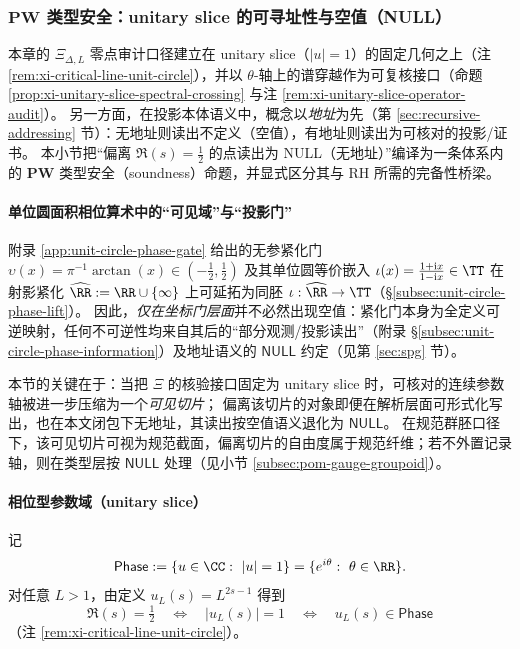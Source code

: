 \subsubsection{\texorpdfstring{$\mathbf{PW}$}{PW} 类型安全：unitary slice 的可寻址性与空值（NULL）}\label{subsec:xi-pw-type-safety-null}
本章的 \(\Xi_{\Delta,L}\) 零点审计口径建立在 unitary slice（\(|u|=1\)）的固定几何之上（注 \ref{rem:xi-critical-line-unit-circle}），并以 \(\theta\)-轴上的谱穿越作为可复核接口（命题 \ref{prop:xi-unitary-slice-spectral-crossing} 与注 \ref{rem:xi-unitary-slice-operator-audit}）。
另一方面，在投影本体语义中，概念以\emph{地址}为先（第 \ref{sec:recursive-addressing} 节）：无地址则读出不定义（空值），有地址则读出为可核对的投影/证书。
本小节把“偏离 \(\Re(s)=\tfrac12\) 的点读出为 NULL（无地址）”编译为一条体系内的 \(\mathbf{PW}\) 类型安全（soundness）命题，并显式区分其与 RH 所需的完备性桥梁。

\paragraph{单位圆面积相位算术中的“可见域”与“投影门”}
附录 \ref{app:unit-circle-phase-gate} 给出的无参紧化门
\(\upsilon(x)=\pi^{-1}\arctan(x)\in(-\tfrac12,\tfrac12)\)
及其单位圆等价嵌入
\(\iota(x)=\frac{1+\mathrm{i}x}{1-\mathrm{i}x}\in\TT\)
在射影紧化 \(\widehat{\RR}:=\RR\cup\{\infty\}\) 上可延拓为同胚 \(\iota:\widehat{\RR}\to\TT\)（\S\ref{subsec:unit-circle-phase-lift}）。
因此，\emph{仅在坐标门层面}并不必然出现空值：紧化门本身为全定义可逆映射，任何不可逆性均来自其后的“部分观测/投影读出”（附录 \S\ref{subsec:unit-circle-phase-information}）及地址语义的 \(\mathsf{NULL}\) 约定（见第 \ref{sec:spg} 节）。
\par
本节的关键在于：当把 \(\Xi\) 的核验接口固定为 unitary slice 时，可核对的连续参数轴被进一步压缩为一个\emph{可见切片}；
偏离该切片的对象即便在解析层面可形式化写出，也在本文闭包下无地址，其读出按空值语义退化为 \(\mathsf{NULL}\)。
在规范群胚口径下，该可见切片可视为规范截面，偏离切片的自由度属于规范纤维；若不外置记录轴，则在类型层按 \(\mathsf{NULL}\) 处理（见小节 \ref{subsec:pom-gauge-groupoid}）。

\paragraph{相位型参数域（unitary slice）}
记
\[
\mathsf{Phase}:=\{u\in\CC:\ |u|=1\}=\{e^{i\theta}:\ \theta\in\RR\}.
\]
对任意 \(L>1\)，由定义 \(u_L(s)=L^{2s-1}\) 得到
\[
\Re(s)=\tfrac12\quad\Longleftrightarrow\quad |u_L(s)|=1\quad\Longleftrightarrow\quad u_L(s)\in \mathsf{Phase}
\]
（注 \ref{rem:xi-critical-line-unit-circle}）。

